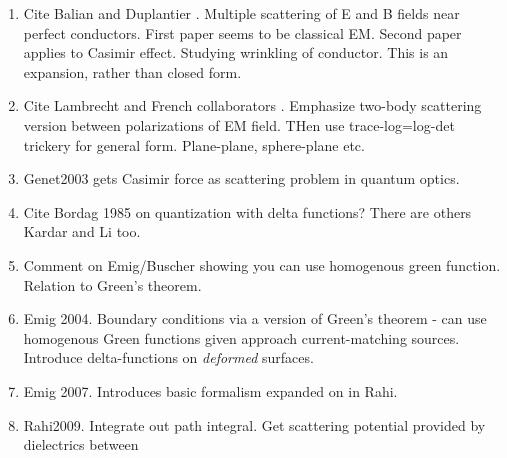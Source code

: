 
\begin{enumerate}
\item Cite Balian and Duplantier \cite{Balian1977, Balian1978}.  Multiple scattering of E and B fields
near perfect conductors.  First paper seems to be classical EM.  Second paper applies to Casimir effect.
Studying wrinkling of conductor.  This is an expansion, rather than closed form.  
 \item Cite Lambrecht and French collaborators
   \cite{Lambrecht2006, MaiaNeto2008,Canaguier-Durand2012}.
    Emphasize two-body scattering version between polarizations of EM field.  THen use trace-log=log-det
    trickery for general form.  Plane-plane, sphere-plane etc.  
\item Genet2003 gets Casimir force as scattering problem in quantum optics.  
\item Cite Bordag 1985 on quantization with delta functions?  There are others
Kardar and Li too.  
\item Comment on Emig/Buscher showing you can use homogenous green function.
  Relation to Green's theorem.
\item Emig 2004.  Boundary conditions via a version of Green's theorem - can use homogenous Green 
functions given approach current-matching sources.  Introduce delta-functions on \emph{deformed} surfaces.  
\item Emig 2007.  Introduces basic formalism expanded on in Rahi.  
\item Rahi2009.  Integrate out path integral.  Get scattering potential provided by dielectrics between

\end{enumerate}
